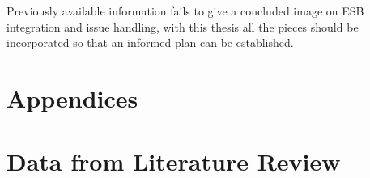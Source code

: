 \documentclass{llncs}
\begin{document}
Previously available information fails to give a concluded image on ESB integration and issue handling, with this thesis all the pieces should be incorporated so that an informed plan can be established.


 


\newpage
\section*{Appendices}
\appendix
\section{Data from Literature Review}
\end{document}
